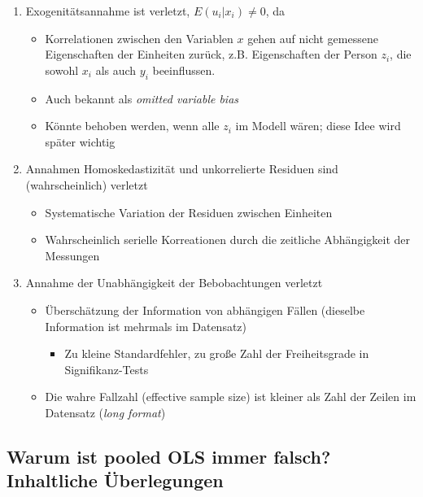 \documentclass[]{book}
\providecommand{\tightlist}{%
  \setlength{\itemsep}{0pt}\setlength{\parskip}{0pt}}
\begin{document}
\begin{enumerate}
\def\labelenumi{\arabic{enumi})}
\tightlist
\item
  Exogenitätsannahme ist verletzt, \(E(u_i|x_i) \neq 0\), da

  \begin{itemize}
  \tightlist
  \item
    Korrelationen zwischen den Variablen \(x\) gehen auf nicht gemessene Eigenschaften der Einheiten zurück, z.B. Eigenschaften der Person \(z_i\), die sowohl \(x_i\) als auch \(y_i\) beeinflussen.
  \item
    Auch bekannt als \emph{omitted variable bias}
  \item
    Könnte behoben werden, wenn alle \(z_i\) im Modell wären; diese Idee wird später wichtig
  \end{itemize}
\item
  Annahmen Homoskedastizität und unkorrelierte Residuen sind (wahrscheinlich) verletzt

  \begin{itemize}
  \tightlist
  \item
    Systematische Variation der Residuen zwischen Einheiten
  \item
    Wahrscheinlich serielle Korreationen durch die zeitliche Abhängigkeit der Messungen
  \end{itemize}
\item
  Annahme der Unabhängigkeit der Bebobachtungen verletzt

  \begin{itemize}
  \tightlist
  \item
    Überschätzung der Information von abhängigen Fällen (dieselbe Information ist mehrmals im Datensatz)

    \begin{itemize}
    \tightlist
    \item
      Zu kleine Standardfehler, zu große Zahl der Freiheitsgrade in Signifikanz-Tests
    \end{itemize}
  \item
    Die wahre Fallzahl (effective sample size) ist kleiner als Zahl der Zeilen im Datensatz (\emph{long format})
  \end{itemize}
\end{enumerate}

\hypertarget{warum-ist-pooled-ols-immer-falsch-inhaltliche-uxfcberlegungen}{%
\subsection*{Warum ist pooled OLS immer falsch? Inhaltliche Überlegungen}\label{warum-ist-pooled-ols-immer-falsch-inhaltliche-uxfcberlegungen}}
\end{document}
